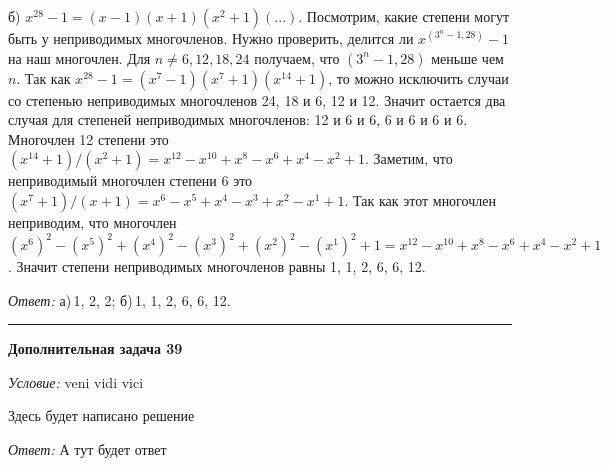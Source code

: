 \documentclass[12pt,a4paper]{article}
\newcommand{\sbs}{\large \bfseries}
\newcommand{\rl}{\vspace{16pt} \hrule \vspace{8pt}}
\begin{document}
б) $x^{28}-1 = (x-1)(x+1)(x^2+1)(...)$. Посмотрим, какие степени могут быть у неприводимых многочленов. Нужно проверить, делится ли $x^{(3^n-1, 28)}-1$ на наш многочлен. Для $n \neq 6, 12, 18, 24$ получаем, что $(3^n-1, 28)$ меньше чем $n$. Так как $x^{28}-1 = (x^7-1)(x^7+1)(x^{14}+1)$, то можно исключить случаи со степенью неприводимых многочленов 24, 18 и 6, 12 и 12. Значит остается два случая для степеней неприводимых многочленов: 12 и 6 и 6, 6 и 6 и 6 и 6.
Многочлен 12 степени это $(x^{14}+1)/(x^2+1) = x^{12}-x^{10}+x^8-x^6+x^4-x^2+1$. Заметим, что неприводимый многочлен степени 6 это  $(x^7+1)/(x+1) = x^6-x^5+x^4-x^3+x^2-x^1+1$. Так как этот многочлен неприводим, что многочлен $(x^6)^2-(x^5)^2+(x^4)^2-(x^3)^2+(x^2)^2-(x^1)^2+1 = x^{12}-x^{10}+x^8-x^6+x^4-x^2+1$. Значит степени неприводимых многочленов равны 1, 1, 2, 6, 6, 12.

{\itshape Ответ: } а)\,1, 2, 2; б)\,1, 1, 2, 6, 6, 12.




\rl
{\sbs Дополнительная задача 39}

{\itshape Условие: } veni vidi vici

Здесь будет написано решение

{\itshape Ответ: } А тут будет ответ
\end{document}
